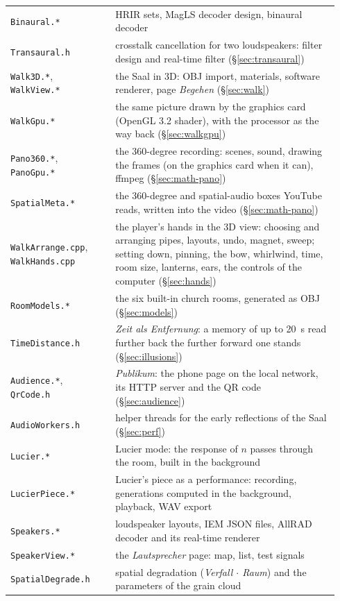 \documentclass[11pt,a4paper,parskip=half,DIV=11,toc=bibliography]{scrartcl}
\newcommand{\ui}[1]{\emph{#1}}                 %
\newcommand{\fn}[1]{\mbox{\texttt{#1}}}
\begin{document}
{\begin{longtable}{@{}p{0.3\linewidth}p{0.64\linewidth}@{}}
\fn{Binaural.*}        & HRIR sets, MagLS decoder design, binaural decoder \\
\fn{Transaural.h}      & crosstalk cancellation for two loudspeakers: filter design and real-time filter (\S\ref{sec:transaural}) \\
\fn{Walk3D.*}, \fn{WalkView.*} & the Saal in 3D: OBJ import, materials, software renderer, page \ui{Begehen} (\S\ref{sec:walk}) \\
\fn{WalkGpu.*}         & the same picture drawn by the graphics card (OpenGL 3.2 shader), with the processor as the way back (\S\ref{sec:walkgpu}) \\
\fn{Pano360.*}, \fn{PanoGpu.*} & the 360-degree recording: scenes, sound, drawing the frames (on the graphics card when it can), ffmpeg (\S\ref{sec:math-pano}) \\
\fn{SpatialMeta.*}     & the 360-degree and spatial-audio boxes YouTube reads, written into the video (\S\ref{sec:math-pano}) \\
\fn{WalkArrange.cpp}, \fn{WalkHands.cpp} & the player's hands in the 3D view: choosing and arranging pipes, layouts, undo, magnet, sweep; setting down, pinning, the bow, whirlwind, time, room size, lanterns, ears, the controls of the computer (\S\ref{sec:hands}) \\
\fn{RoomModels.*}      & the six built-in church rooms, generated as OBJ (\S\ref{sec:models}) \\
\fn{TimeDistance.h}    & \ui{Zeit als Entfernung}: a memory of up to \SI{20}{s} read further back the further forward one stands (\S\ref{sec:illusions}) \\
\fn{Audience.*}, \fn{QrCode.h} & \ui{Publikum}: the phone page on the local network, its HTTP server and the QR code (\S\ref{sec:audience}) \\
\fn{AudioWorkers.h}    & helper threads for the early reflections of the Saal (\S\ref{sec:perf}) \\
\fn{Lucier.*}        & Lucier mode: the response of $n$ passes through the room, built in the background \\
\fn{LucierPiece.*}   & Lucier's piece as a performance: recording, generations computed in the background, playback, WAV export \\
\fn{Speakers.*}      & loudspeaker layouts, IEM JSON files, AllRAD decoder and its real-time renderer \\
\fn{SpeakerView.*}   & the \ui{Lautsprecher} page: map, list, test signals \\
\fn{SpatialDegrade.h} & spatial degradation (\ui{Verfall $\cdot$ Raum}) and the parameters of the grain cloud \\

\end{longtable}}
\end{document}
